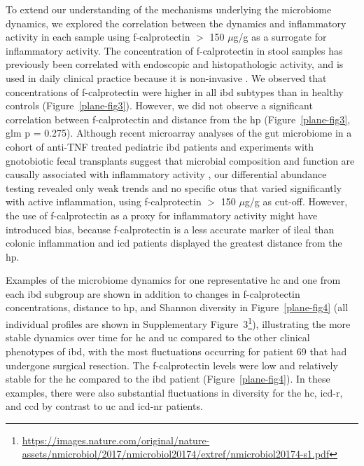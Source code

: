 To extend our understanding of the mechanisms underlying the microbiome dynamics, we explored the correlation between the dynamics and inflammatory activity in each sample using f-calprotectin $>$ 150 $\mu$g/g as a surrogate for inflammatory activity. The concentration of f-calprotectin in stool samples has previously been correlated with endoscopic and histopathologic activity, and is used in daily clinical practice because it is non-invasive \cite{Lewis2011}. We observed that concentrations of f-calprotectin were higher in all \gls{ibd} subtypes than in healthy controls (Figure~\ref{plane-fig3}). However, we did not observe a significant correlation between f-calprotectin and distance from the \gls{hp}  (Figure~\ref{plane-fig3}, \gls{glm} p = 0.275). Although recent microarray analyses of the gut microbiome in a cohort of anti-TNF treated pediatric \gls{ibd} patients\cite{Kolho2015} and experiments with gnotobiotic fecal transplants suggest that microbial composition and function are causally associated with inflammatory activity \cite{Rooks2014}, our differential abundance testing revealed only weak trends and no specific \glspl{otu} that varied significantly with active inflammation, using f-calprotectin $>$ 150 $\mu$g/g as cut-off. However, the use of f-calprotectin as a proxy for inflammatory activity might have introduced bias, because f-calprotectin is a less accurate marker of ileal than colonic inflammation \cite{Sipponen2008} and \gls{icd} patients displayed the greatest distance from the \gls{hp}.

Examples of the microbiome dynamics for one representative \gls{hc} and one from each \gls{ibd} subgroup are shown in addition to changes in f-calprotectin concentrations, distance to \gls{hp}, and Shannon diversity in Figure~\ref{plane-fig4} (all individual profiles are shown in Supplementary Figure~3\footnote{\label{suppdf3}\url{https://images.nature.com/original/nature-assets/nmicrobiol/2017/nmicrobiol20174/extref/nmicrobiol20174-s1.pdf}}), illustrating the more stable dynamics over time for \gls{hc} and \gls{uc} compared to the other clinical phenotypes of \gls{ibd}, with the most fluctuations occurring for patient 69 that had undergone surgical resection. The f-calprotectin levels were low and relatively stable for the \gls{hc} compared to the \gls{ibd} patient (Figure~\ref{plane-fig4}). In these examples, there were also substantial fluctuations in diversity for the \gls{hc}, \gls{icd}-r, and \gls{ccd} by contrast to \gls{uc} and \gls{icd}-nr patients.

